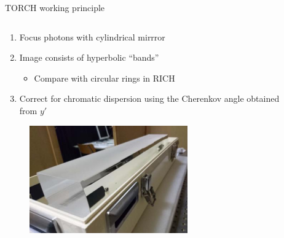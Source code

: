 \documentclass[xcolor={dvipsnames}]{beamer}
\begin{document}
\begin{frame}{TORCH working principle}
  \begin{columns}
    \begin{column}{0.65\textwidth}
      \begin{enumerate}
        \setlength\itemsep{1.0em}
        \item{Focus photons with cylindrical mirrror}
        \item{Image consists of hyperbolic ``bands''}
        \begin{itemize}
          \item{Compare with circular rings in RICH}
        \end{itemize}
        \item{Correct for chromatic dispersion using the Cherenkov angle obtained from $y'$}
      \end{enumerate}
      \begin{figure}
        \centering
        \includegraphics[width = 0.7\textwidth]{Figs/FocusingBlock_lab.png}
      \end{figure}
    \end{column}
    \begin{column}{0.35\textwidth}
      \begin{figure}
        \centering

\end{figure}
\end{column}
\end{columns}
\end{frame}
\end{document}
